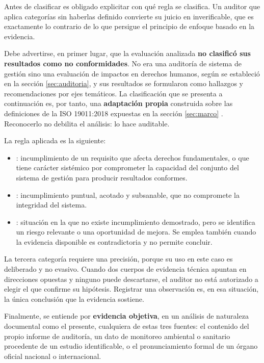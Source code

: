 Antes de clasificar es obligado explicitar con qué regla se clasifica. Un auditor
que aplica categorías sin haberlas definido convierte su juicio en
inverificable, que es exactamente lo contrario de lo que persigue el principio de
enfoque basado en la evidencia.

Debe advertirse, en primer lugar, que la evaluación analizada \textbf{no clasificó
sus resultados como no conformidades}. No era una auditoría de sistema de gestión
sino una evaluación de impactos en derechos humanos, según se estableció en la
sección \ref{sec:auditoria}, y sus resultados se formularon como hallazgos y
recomendaciones por ejes temáticos. La clasificación que se presenta a
continuación es, por tanto, una \textbf{adaptación propia} construida sobre las
definiciones de la ISO 19011:2018 expuestas en la sección \ref{sec:marco}
\parencite{iso2018iso19011}. Reconocerlo no debilita el análisis: lo hace
auditable.

La regla aplicada es la siguiente:

\begin{itemize}
  \item \NCmayor: incumplimiento de un requisito que afecta derechos
        fundamentales, o que tiene carácter sistémico por comprometer la
        capacidad del conjunto del sistema de gestión para producir resultados
        conformes.
  \item \NCmenor: incumplimiento puntual, acotado y subsanable, que no
        compromete la integridad del sistema.
  \item \OBS: situación en la que no existe incumplimiento demostrado, pero se
        identifica un riesgo relevante o una oportunidad de mejora. Se emplea
        también cuando la evidencia disponible es contradictoria y no permite
        concluir.
\end{itemize}

La tercera categoría requiere una precisión, porque su uso en este caso es
deliberado y no evasivo. Cuando dos cuerpos de evidencia técnica apuntan en
direcciones opuestas y ninguno puede descartarse, el auditor no está autorizado a
elegir el que confirme su hipótesis. Registrar una observación es, en esa
situación, la única conclusión que la evidencia sostiene.

Finalmente, se entiende por \textbf{evidencia objetiva}, en un análisis de
naturaleza documental como el presente, cualquiera de estas tres fuentes: el
contenido del propio informe de auditoría, un dato de monitoreo ambiental o
sanitario procedente de un estudio identificable, o el pronunciamiento formal de
un órgano oficial nacional o internacional.

